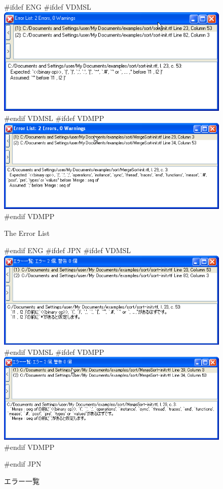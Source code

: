 \documentclass[\pformat,12pt]{article}
\begin{document}
\begin{figure}[tbh]
\begin{center}
#ifdef ENG
#ifdef VDMSL
\includegraphics[width=\textwidth]{errorList-slENG.png}
#endif VDMSL
#ifdef VDMPP
\includegraphics[width=\textwidth]{errorList-ppENG.png}
#endif VDMPP
\caption{The Error List}
#endif ENG
#ifdef JPN
#ifdef VDMSL
\includegraphics[width=\textwidth]{errorList-sl.png}
#endif VDMSL
#ifdef VDMPP
\includegraphics[width=\textwidth]{errorList-pp.png}
#endif VDMPP
\caption{エラー一覧}
#endif JPN
\label{fig:error}
\end{center}
\end{figure}
\end{document}

